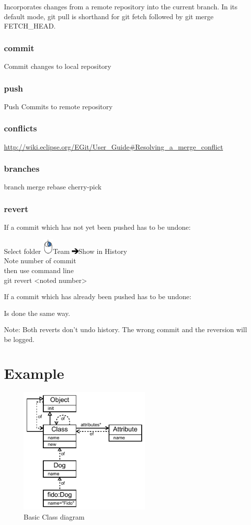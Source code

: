 \documentclass{scrreprt}
\newcounter{myCounter}[subsubsection]
\newcommand{\rightMouse}{%
\includegraphics[width=15pt]{img/rightMouse.jpg}}
\newcommand{\rightArrow}{%
\includegraphics[width=10pt]{img/rightArrow.png}\hspace{1mm}}
\newcommand{\layerOne}[1]{\chapter{#1}}
\newcommand{\layerThree}[1]{\subsection{#1} \setcounter{myCounter}{0}}
\begin{document}
Incorporates changes from a remote repository into the current branch. 
In its default mode, git pull is shorthand for git fetch followed by git merge FETCH_HEAD.

\layerThree{commit}

Commit changes to local repository

\layerThree{push}

Push Commits to remote repository

\layerThree{conflicts}

\url{http://wiki.eclipse.org/EGit/User_Guide#Resolving_a_merge_conflict}

\layerThree{branches}
branch
merge
rebase
cherry-pick

\layerThree{revert}

If a commit which has not yet been pushed has to be undone:

Select folder \rightMouse Team \rightArrow Show in History \\
Note number of commit
\\ then use command line \\
{\ttfamily git revert <noted number>}

\vspace{5mm}
\noindent If a commit which has already been pushed has to be undone:

Is done the same way.

\vspace{5mm}
\noindent Note: Both reverts don't undo history. The wrong commit and the reversion will
be logged.

\layerOne{Example}

\begin{figure}[ht!]
	\centering
	\includegraphics[width=185pt]{img/classDiagram1.pdf}
	\caption{Basic Class diagram}
	\label{fig:exampleDogClassDiagram}
\end{figure} 
\end{document}
